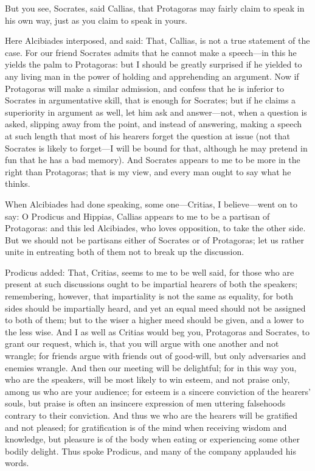 \documentclass[11pt,letter]{article}
\begin{document}
\par  But you see, Socrates, said Callias, that Protagoras may fairly claim to speak in his own way, just as you claim to speak in yours.

\par  Here Alcibiades interposed, and said: That, Callias, is not a true statement of the case. For our friend Socrates admits that he cannot make a speech—in this he yields the palm to Protagoras: but I should be greatly surprised if he yielded to any living man in the power of holding and apprehending an argument. Now if Protagoras will make a similar admission, and confess that he is inferior to Socrates in argumentative skill, that is enough for Socrates; but if he claims a superiority in argument as well, let him ask and answer—not, when a question is asked, slipping away from the point, and instead of answering, making a speech at such length that most of his hearers forget the question at issue (not that Socrates is likely to forget—I will be bound for that, although he may pretend in fun that he has a bad memory). And Socrates appears to me to be more in the right than Protagoras; that is my view, and every man ought to say what he thinks.

\par  When Alcibiades had done speaking, some one—Critias, I believe—went on to say: O Prodicus and Hippias, Callias appears to me to be a partisan of Protagoras: and this led Alcibiades, who loves opposition, to take the other side. But we should not be partisans either of Socrates or of Protagoras; let us rather unite in entreating both of them not to break up the discussion.

\par  Prodicus added: That, Critias, seems to me to be well said, for those who are present at such discussions ought to be impartial hearers of both the speakers; remembering, however, that impartiality is not the same as equality, for both sides should be impartially heard, and yet an equal meed should not be assigned to both of them; but to the wiser a higher meed should be given, and a lower to the less wise. And I as well as Critias would beg you, Protagoras and Socrates, to grant our request, which is, that you will argue with one another and not wrangle; for friends argue with friends out of good-will, but only adversaries and enemies wrangle. And then our meeting will be delightful; for in this way you, who are the speakers, will be most likely to win esteem, and not praise only, among us who are your audience; for esteem is a sincere conviction of the hearers' souls, but praise is often an insincere expression of men uttering falsehoods contrary to their conviction. And thus we who are the hearers will be gratified and not pleased; for gratification is of the mind when receiving wisdom and knowledge, but pleasure is of the body when eating or experiencing some other bodily delight. Thus spoke Prodicus, and many of the company applauded his words.
\end{document}
